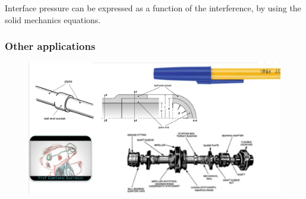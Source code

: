\documentclass[class=report, crop=false, 12pt,a4paper]{standalone}
\begin{document}
Interface pressure can be expressed as a function of the interference, by using the solid mechanics equations.
\subsubsection{Other applications}
\begin{figure}[H]
    \centering
    \includegraphics[width = \textwidth]{../img/diagram122.png}
    \caption{}
\end{figure}
\end{document}
